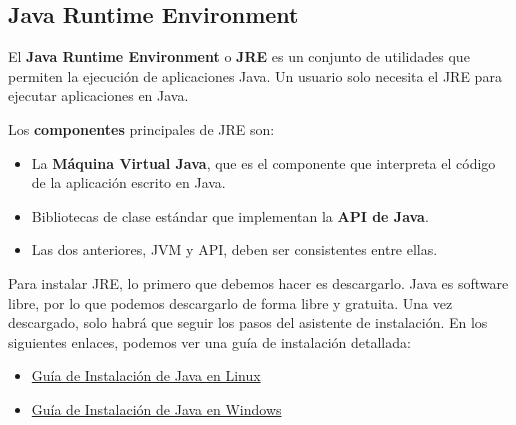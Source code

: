 \subsection{Java Runtime Environment}
El \textbf{Java Runtime Environment} o \textbf{JRE} es un conjunto de utilidades que permiten la ejecución de aplicaciones Java. Un usuario solo necesita el JRE para ejecutar aplicaciones en Java.\cite{wiki03}

Los \textbf{componentes} principales de JRE son:

\begin{itemize}
    \item La \textbf{Máquina Virtual Java}, que es el componente que interpreta el código de la aplicación escrito en Java.
    \item Bibliotecas de clase estándar que implementan la \textbf{API de Java}.
    \item Las dos anteriores, JVM y API, deben ser consistentes entre ellas.
\end{itemize}

Para instalar JRE, lo primero que debemos hacer es descargarlo. Java es software libre, por lo que podemos descargarlo de forma libre y gratuita. Una vez descargado, solo habrá que seguir los pasos del asistente de instalación. En los siguientes enlaces, podemos ver una guía de instalación detallada:

\begin{itemize}
    \item \href{https://www.java.com/es/download/help/linux_install.html}{Guía de Instalación de Java en Linux}
    \item \href{https://www.java.com/es/download/help/windows_manual_download.html}{Guía de Instalación de Java en Windows}
\end{itemize}




\glsaddall
\printglossaries


\newpage
{}



